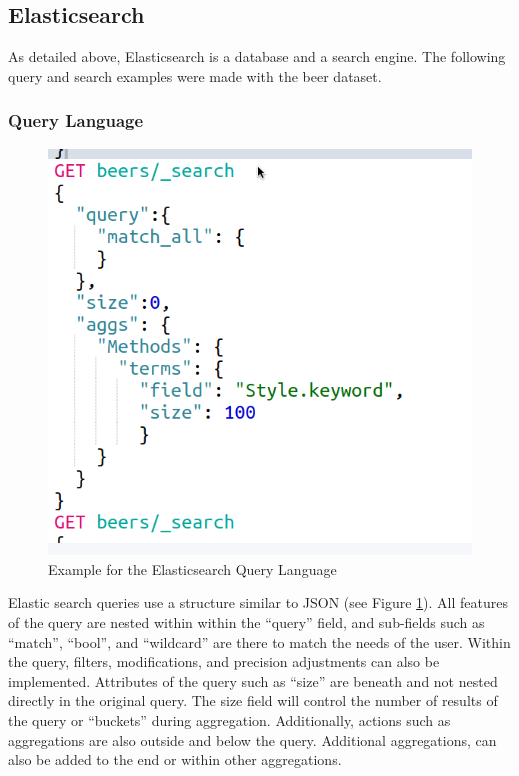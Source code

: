 \documentclass[bibliography=totoc]{article}
\begin{document}
\subsection{Elasticsearch}
As detailed above, Elasticsearch is a database and a search engine.
The following query and search examples were made with the beer dataset.

\subsubsection{Query Language}
\begin{figure}
   \includegraphics[height=0.7\textwidth]{beer_query_language.png}
   \caption{\label{beer_query_language}Example for the Elasticsearch Query Language} 
\end{figure}
Elastic search queries use a structure similar to JSON (see Figure \ref{beer_query_language}).
All features of the query are nested within within the “query” field, 
and sub-fields such as “match”, “bool”, and “wildcard” are 
there to match the needs of the user. 
Within the query, filters, modifications, and precision adjustments 
can also be implemented.
Attributes of the query such as “size” are beneath and not nested 
directly in the original query. The size field will control the 
number of results of the query or “buckets” during aggregation. 
Additionally, actions such as aggregations are also outside and below 
the query. Additional aggregations, can also be added to the end 
or within other aggregations.
\end{document}
